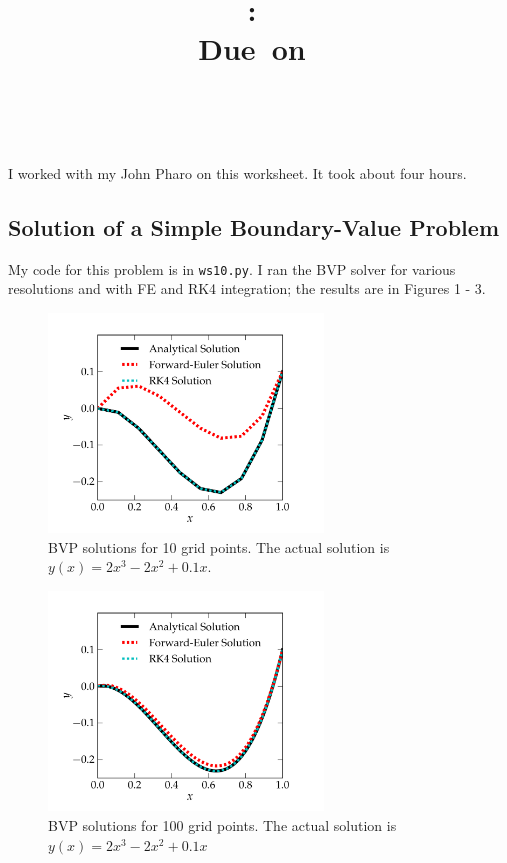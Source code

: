 \documentclass{article}
\title{\vspace{2in}\textmd{\textbf{\hmwkClass:\ \hmwkTitle}}\\\normalsize\vspace{0.1in}\small{Due\ on\ \hmwkDueDate}\\\vspace{0.1in}\large{\textit{\hmwkClassInstructor\ \hmwkClassTime}}\vspace{3in}}
\date{}
\author{\textbf{\hmwkAuthorName}}
\begin{document}
\begin{spacing}{1.1}

\newpage


I worked with my John Pharo on this worksheet. It took about four hours.

\subsection{Solution of a Simple Boundary-Value Problem}

My code for this problem is in \texttt{ws10.py}. I ran the BVP solver for various resolutions and with FE and RK4 integration; the results are in Figures 1 - 3.

\begin{figure}[H]
 \centering
 \hspace{0cm} \includegraphics[width=0.65\textwidth]{fig-10pts.pdf}
 \caption{BVP solutions for 10 grid points. The actual solution is \(y(x) = 2x^3-2x^2+0.1x\).}
 \label{fig-problem1}
\end{figure} 

\begin{figure}[H]
 \centering
 \hspace{0cm} \includegraphics[width=0.65\textwidth]{fig-100pts.pdf}
 \caption{BVP solutions for 100 grid points. The actual solution is \(y(x) = 2x^3-2x^2+0.1x\)}
 \label{fig-problem1}
\end{figure} 


\end{spacing}
\end{document}
